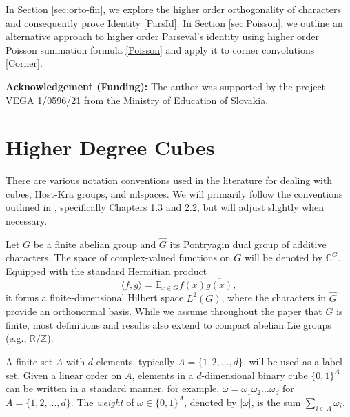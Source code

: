 \documentclass{amsart}
\theoremstyle{definition}
\theoremstyle{remark}
\numberwithin{equation}{section}
\begin{document}
In Section \ref{sec:orto-fin}, we explore the higher order orthogonality of characters and consequently prove Identity \eqref{ParsId}. In Section \ref{sec:Poisson}, we outline an alternative approach to higher order Parseval's identity using higher order Poisson summation formula \eqref{Poisson} and apply it to corner convolutions \eqref{Corner}.
 
{\bf Acknowledgement (Funding):} 
The author was supported by the project VEGA 1/0596/21 from the Ministry of Education of Slovakia. 




\section{Higher Degree Cubes}
\label{sec:HDC}

There are various notation conventions used in the literature for dealing with cubes, Host-Kra groups, and nilspaces. We will primarily follow the conventions outlined in \cite{Tao12}, specifically Chapters 1.3 and 2.2, but will adjust slightly when necessary. 


Let $G$ be a finite abelian group and $\widehat{G}$ its Pontryagin dual group of additive characters. The space of complex-valued functions on $G$ will be denoted by $\mathbb{C}^G$. Equipped with the standard Hermitian product
$$ \langle f, g \rangle = \mathbb{E}_{x \in G} f(x)\overline{ g(x)},$$ 
it forms a finite-dimensional Hilbert space $L^2(G)$, where the characters in $\widehat{G}$ provide an orthonormal basis. While we assume throughout the paper that $G$ is finite, most definitions and results also extend to compact abelian Lie groups (e.g., $\mathbb{R}/\mathbb{Z}$).



A finite set $A$ with $d$ elements, typically $A=\{1, 2, \dots, d\}$, will be used as a label set. Given a linear order on $A$, elements in a $d$-dimensional binary cube $\{0,1\}^A$ can be written in a standard manner, for example, $ \omega = \omega_1 \omega_2  \dots \omega_d$ for $A=\{1,2,\dots,d\}$.  The \textit{weight} of $\omega \in \{0,1\}^A$, denoted by $|\omega|$, is the sum $\sum_{i\in A} \omega_i$.  
\end{document}
